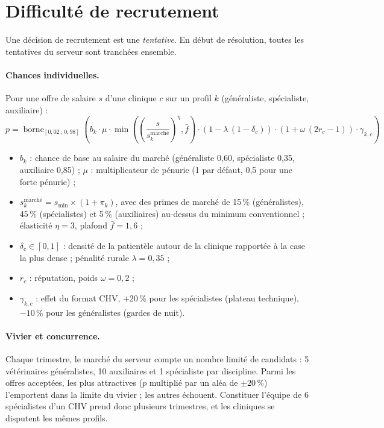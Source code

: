 \documentclass[11pt,a4paper]{article}
\begin{document}
\section{Difficulté de recrutement}

Une décision de recrutement est une \emph{tentative}. En début de
résolution, toutes les tentatives du serveur sont tranchées ensemble.

\paragraph{Chances individuelles.} Pour une offre de salaire $s$ d'une
clinique $c$ sur un profil $k$ (généraliste, spécialiste, auxiliaire) :
\[
  p = \operatorname{borne}_{[0{,}02\,;\,0{,}98]}\!\left(
    b_k \cdot \mu \cdot \min\!\left(\left(\frac{s}{s^{\text{marché}}_k}\right)^{\eta}, \bar{f}\right)
    \cdot \left(1 - \lambda\,(1-\delta_c)\right)
    \cdot \left(1 + \omega\,(2 r_c - 1)\right)
    \cdot \gamma_{k,c}
  \right)
\]
\begin{itemize}
  \item $b_k$ : chance de base au salaire du marché (généraliste 0,60,
    spécialiste 0,35, auxiliaire 0,85) ; $\mu$ : multiplicateur de pénurie
    (1 par défaut, 0,5 pour une forte pénurie) ;
  \item $s^{\text{marché}}_k = s_{\min} \times (1 + \pi_k)$, avec des
    primes de marché de 15\,\% (généralistes), 45\,\% (spécialistes) et
    5\,\% (auxiliaires) au-dessus du minimum conventionnel ; élasticité
    $\eta = 3$, plafond $\bar{f} = 1{,}6$ ;
  \item $\delta_c \in [0, 1]$ : densité de la patientèle autour de la
    clinique rapportée à la case la plus dense ; pénalité rurale
    $\lambda = 0{,}35$ ;
  \item $r_c$ : réputation, poids $\omega = 0{,}2$ ;
  \item $\gamma_{k,c}$ : effet du format CHV, $+20\,\%$ pour les spécialistes
    (plateau technique), $-10\,\%$ pour les généralistes (gardes de nuit).
\end{itemize}

\paragraph{Vivier et concurrence.} Chaque trimestre, le marché du serveur
compte un nombre limité de candidats : 5 vétérinaires généralistes,
10 auxiliaires et 1 spécialiste par discipline. Parmi les offres
acceptées, les plus attractives ($p$ multiplié par un aléa de $\pm 20\,\%$)
l'emportent dans la limite du vivier ; les autres échouent. Constituer
l'équipe de 6 spécialistes d'un CHV prend donc plusieurs trimestres, et
les cliniques se disputent les mêmes profils.
\end{document}
